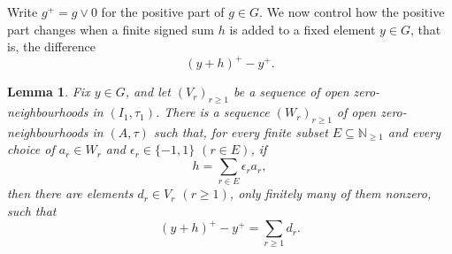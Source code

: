 \documentclass[preprint,3p]{elsarticle}
\theoremstyle{plain}
\newtheorem{lem}[thm]{Lemma}
\theoremstyle{definition}
\numberwithin{equation}{section}
\begin{document}
Write $g^+=g\vee0$ for the positive part of $g\in G$.
We now control how the positive part changes when a finite signed sum
$h$ is added to a fixed element $y\in G$, that is, the difference
\[
 (y+h)^+-y^+.
\]

\begin{lem}
\label{lem-tail-telescoping}
Fix $y\in G$, and let $(V_r)_{r\geq1}$ be a sequence of open
zero-neighbourhoods in $(I_1,\tau_1)$.  
There is a sequence $(W_r)_{r\geq1}$ of open zero-neighbourhoods
in $(A,\tau)$ such that, for every finite subset
$E\subseteq\mathbb N_{\geq1}$ and every choice of
$a_r\in W_r$ and $\epsilon_r\in\{-1,1\}$ $(r\in E)$, if
\[
 h=\sum_{r\in E}\epsilon_r a_r,
\]
then there are elements $d_r\in V_r$ $(r\geq1)$, only finitely many of
them nonzero, such that
\[
 (y+h)^+-y^+=\sum_{r\geq1}d_r.
\]
\end{lem}
\end{document}
